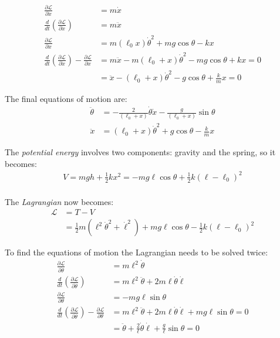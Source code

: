 \documentclass[letterpaper,8pt]{article}
\begin{document}
\begin{align*}
\frac{\partial \mathcal{L}}{\partial \dot{x}} &= m \dot{x} \\
\frac{d}{dt} \left( \frac{\partial \mathcal{L}}{\partial \dot{x}} \right) &= m \ddot{x} \\
\frac{\partial \mathcal{L}}{\partial x} &= m (\ell_0 x) \dot{\theta}^2 + mg \cos \theta - kx \\
\frac{d}{dt} \left( \frac{\partial \mathcal{L}}{\partial \dot{x}} \right) - \frac{\partial \mathcal{L}}{\partial x} &=
m \ddot{x} - m (\ell_0 + x) \dot{\theta}^2 - mg \cos \theta + kx = 0 \\
&= \ddot{x} - (\ell_0 + x) \dot{\theta}^2 - g \cos \theta + \frac{k}{m}x = 0
\end{align*}

The final equations of motion are:
\begin{align*}
\ddot{\theta} &= - \frac{2}{(\ell_0 + x)} \dot{\theta} \dot{x} - \frac{g}{(\ell_0 + x)} \sin\theta \\
\ddot{x} &= (\ell_0 + x) \dot{\theta}^2 + g \cos \theta - \frac{k}{m}x
\end{align*}




The \emph{potential energy} involves two components: gravity and the spring, so it becomes:
\begin{align*}
V = mgh + \frac{1}{2} kx^2 = - mg \ell \cos \theta + \frac{1}{2} k \left( \ell - \ell_0 \right)^2 \\
\end{align*}

The \emph{Lagrangian} now becomes:
\begin{align*}
\mathcal{L} &= T - V \\
  &= \frac{1}{2}m \left( \ell^2 \dot{\theta}^2 + \dot{\ell}^2 \right) + mg \ell \cos \theta - \frac{1}{2} k \left( \ell - \ell_0 \right)^2
\end{align*}

To find the equations of motion the Lagrangian needs to be solved twice:
\begin{align*}
\frac{\partial \mathcal{L}}{\partial \dot{\theta}} &= m \ell^2 \dot{\theta} \\
\frac{d}{dt} \left( \frac{\partial \mathcal{L}}{\partial \dot{\theta}} \right) &= m \ell^2 \ddot{\theta} + 2 m \ell \dot{\theta} \dot{\ell} \\
\frac{\partial \mathcal{L}}{\partial \theta} &= -mg \ell \sin \theta \\
\frac{d}{dt} \left( \frac{\partial \mathcal{L}}{\partial \dot{\theta}} \right) - \frac{\partial \mathcal{L}}{\partial \theta} &=
 m \ell^2 \ddot{\theta} + 2 m \ell \dot{\theta} \dot{\ell} + mg \ell \sin \theta = 0 \\
&= \ddot{\theta} + \frac{2}{\ell}\dot{\theta} \dot{\ell} + \frac{g}{\ell} \sin \theta = 0 
\end{align*}
\end{document}
